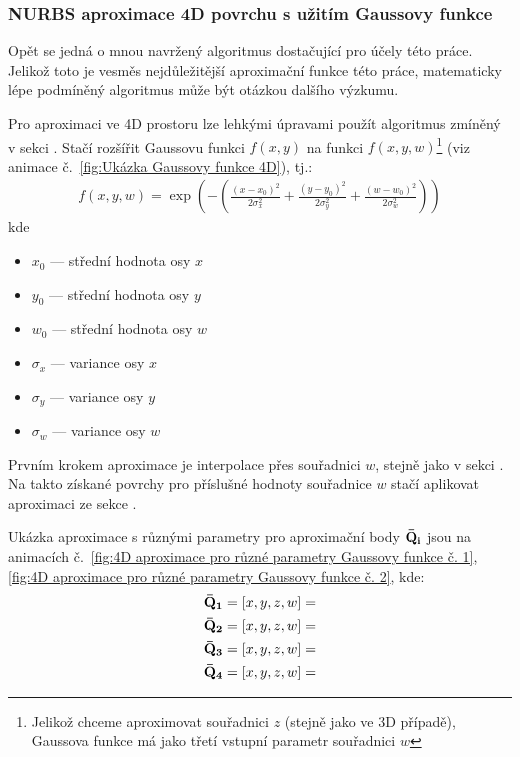 \subsubsection{NURBS aproximace 4D povrchu s užitím Gaussovy funkce}
Opět se jedná o mnou navržený algoritmus dostačující pro účely této práce. Jelikož toto je vesměs nejdůležitější aproximační funkce této práce, matematicky lépe podmíněný algoritmus může být otázkou dalšího výzkumu.\par
Pro aproximaci ve 4D prostoru lze lehkými úpravami použít algoritmus zmíněný v
sekci . Stačí rozšířit
Gaussovu funkci $f(x,y)$ na funkci $f(x,y,w)$\footnote{Jelikož chceme
    aproximovat souřadnici $z$ (stejně jako ve 3D případě), Gaussova funkce má jako
    třetí vstupní parametr souřadnici $w$} (viz animace č.~\ref{fig:Ukázka Gaussovy
    funkce 4D}), tj.:
\begin{align}
    f(x,y,w) = \exp\left(-\left(\frac{(x - x_0)^2}{2\sigma_x^2} + \frac{(y - y_0)^2}{2\sigma_y^2} + \frac{(w - w_0)^2}{2\sigma_w^2} \right)\right)
\end{align}
kde
\begin{itemize}
    \item $x_0$ --- střední hodnota osy $x$
    \item $y_0$ --- střední hodnota osy $y$
    \item $w_0$ --- střední hodnota osy $w$
    \item $\sigma_x$ --- variance osy $x$
    \item $\sigma_y$ --- variance osy $y$
    \item $\sigma_w$ --- variance osy $w$
\end{itemize}
Prvním krokem aproximace je interpolace přes souřadnici $w$, stejně jako
v sekci . Na takto získané povrchy
pro příslušné hodnoty souřadnice $w$ stačí aplikovat aproximaci ze sekce .
\par
Ukázka aproximace s různými parametry pro aproximační body $\bf{\bar{Q}}_i$
jsou na animacích č.~\ref{fig:4D aproximace pro různé parametry Gaussovy funkce č. 1},
\ref{fig:4D aproximace pro různé parametry Gaussovy funkce č. 2}, kde:
\begin{align}
    \bf{\bar{Q}}_1 & = [x, y, z, w] =  \\
    \bf{\bar{Q}}_2 & = [x, y, z, w]=   \\
    \bf{\bar{Q}}_3 & = [x, y, z, w]=   \\
    \bf{\bar{Q}}_4 & = [x, y, z, w] = 
\end{align}
